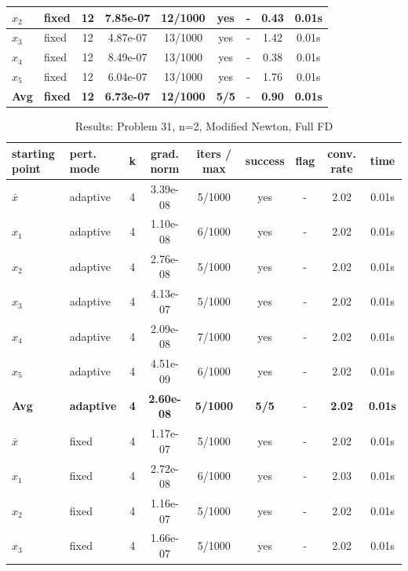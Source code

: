 \begin{longtable}{|l|l|c|c|c|c|c|c|c|}
\hline
$x_2$ & fixed & 12 & 7.85e-07 & 12/1000 & yes & - & 0.43 & 0.01s \\
\hline
$x_3$ & fixed & 12 & 4.87e-07 & 13/1000 & yes & - & 1.42 & 0.01s \\
\hline
$x_4$ & fixed & 12 & 8.49e-07 & 13/1000 & yes & - & 0.38 & 0.01s \\
\hline
$x_5$ & fixed & 12 & 6.04e-07 & 13/1000 & yes & - & 1.76 & 0.01s \\
\hline
\hline\hline
\textbf{Avg} & \textbf{fixed} & \textbf{12} & \textbf{6.73e-07} & \textbf{12/1000} & \textbf{5/5} & - & \textbf{0.90} & \textbf{0.01s} \\
\hline\hline
\end{longtable}


\begin{longtable}{|l|l|c|c|c|c|c|c|c|}
\caption{Results: Problem 31, n=2, Modified Newton, Full FD} \\
\hline
\textbf{starting point} & \textbf{pert. mode} & \textbf{k} & \textbf{grad. norm} & \textbf{iters / max} & \textbf{success} & \textbf{flag} & \textbf{conv. rate} & \textbf{time} \\
\hline
\endfirsthead
\endhead
\endfoot
\hline
\endlastfoot
$\bar{x}$ & adaptive & 4 & 3.39e-08 & 5/1000 & yes & - & 2.02 & 0.01s \\
\hline
$x_1$ & adaptive & 4 & 1.10e-08 & 6/1000 & yes & - & 2.02 & 0.01s \\
\hline
$x_2$ & adaptive & 4 & 2.76e-08 & 5/1000 & yes & - & 2.02 & 0.01s \\
\hline
$x_3$ & adaptive & 4 & 4.13e-07 & 5/1000 & yes & - & 2.02 & 0.01s \\
\hline
$x_4$ & adaptive & 4 & 2.09e-08 & 7/1000 & yes & - & 2.02 & 0.01s \\
\hline
$x_5$ & adaptive & 4 & 4.51e-09 & 6/1000 & yes & - & 2.02 & 0.01s \\
\hline
\hline\hline
\textbf{Avg} & \textbf{adaptive} & \textbf{4} & \textbf{2.60e-08} & \textbf{5/1000} & \textbf{5/5} & - & \textbf{2.02} & \textbf{0.01s} \\
\hline\hline
\hline
$\bar{x}$ & fixed & 4 & 1.17e-07 & 5/1000 & yes & - & 2.02 & 0.01s \\
\hline
$x_1$ & fixed & 4 & 2.72e-08 & 6/1000 & yes & - & 2.03 & 0.01s \\
\hline
$x_2$ & fixed & 4 & 1.16e-07 & 5/1000 & yes & - & 2.02 & 0.01s \\
\hline
$x_3$ & fixed & 4 & 1.66e-07 & 5/1000 & yes & - & 2.02 & 0.01s \\
\hline

\end{longtable}
